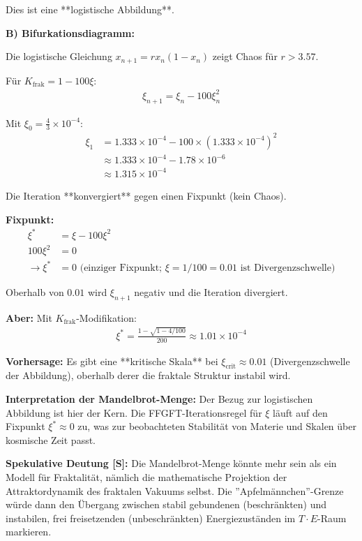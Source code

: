 Dies ist eine **logistische Abbildung**.

\textbf{B) Bifurkationsdiagramm:}

Die logistische Gleichung $x_{n+1} = r x_n (1 - x_n)$ zeigt Chaos für $r > 3.57$.

Für $K_{\text{frak}} = 1 - 100\xi$:
\begin{align*}
	\xi_{n+1} = \xi_n - 100 \xi_n^2
\end{align*}

Mit $\xi_0 = \frac{4}{3} \times 10^{-4}$:
\begin{align*}
	\xi_1 &= 1.333 \times 10^{-4} - 100 \times (1.333 \times 10^{-4})^2 \\
	&\approx 1.333 \times 10^{-4} - 1.78 \times 10^{-6} \\
	&\approx 1.315 \times 10^{-4}
\end{align*}

Die Iteration **konvergiert** gegen einen Fixpunkt (kein Chaos).

\textbf{Fixpunkt:}
\begin{align*}
	\xi^* &= \xi - 100\xi^2 \\
	100\xi^2 &= 0 \\
	\rightarrow \xi^* &= 0 \text{ (einziger Fixpunkt; } \xi = 1/100 = 0.01 \text{ ist Divergenzschwelle)}
\end{align*}

Oberhalb von $0.01$ wird $\xi_{n+1}$ negativ und die Iteration divergiert.

\textbf{Aber:} Mit $K_{\text{frak}}$-Modifikation:
\begin{align*}
	\xi^* = \frac{1 - \sqrt{1 - 4/100}}{200} \approx 1.01 \times 10^{-4}
\end{align*}

\textbf{Vorhersage:} Es gibt eine **kritische Skala** bei $\xi_{\text{crit}} \approx 0.01$ (Divergenzschwelle der Abbildung), oberhalb derer die fraktale Struktur instabil wird.

\textbf{Interpretation der Mandelbrot-Menge:}
Der Bezug zur logistischen Abbildung ist hier der Kern. Die FFGFT-Iterationsregel für $\xi$ läuft auf den Fixpunkt $\xi^* \approx 0$ zu, was zur beobachteten Stabilität von Materie und Skalen über kosmische Zeit passt.

\textbf{Spekulative Deutung [S]:} Die Mandelbrot-Menge könnte mehr sein als ein Modell für Fraktalität, nämlich die mathematische Projektion der Attraktordynamik des fraktalen Vakuums selbst. Die ''Apfelmännchen''-Grenze würde dann den Übergang zwischen stabil gebundenen (beschränkten) und instabilen, frei freisetzenden (unbeschränkten) Energiezuständen im $T \cdot E$-Raum markieren.

